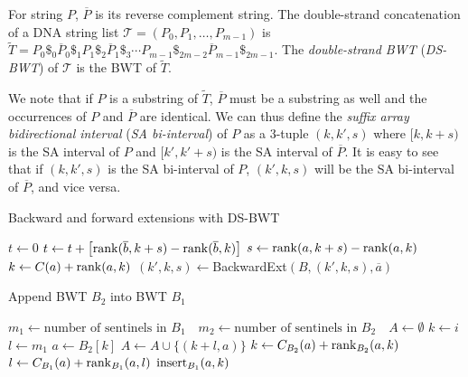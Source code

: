\documentclass[webpdf,contemporary,large,namedate]{oup-authoring-template}%
\begin{document}
For string $P$, $\overline{P}$ is its reverse complement string.
The double-strand concatenation of a DNA string list $\mathcal{T}=(P_0,P_1,\ldots,P_{m-1})$ is
$\tilde{T}=P_0\$_0\overline{P}_0\$_1P_1\$_2\overline{P}_1\$_3\cdots P_{m-1}\$_{2m-2}\overline{P}_{m-1}\$_{2m-1}$.
The \emph{double-strand BWT} (\emph{DS-BWT}) of $\mathcal{T}$ is the BWT of $\tilde{T}$.

We note that if $P$ is a substring of $\tilde{T}$,
$\overline{P}$ must be a substring as well and the occurrences of $P$ and $\overline{P}$ are identical.
We can thus define the \emph{suffix array bidirectional interval} (\emph{SA bi-interval}) of $P$
as a 3-tuple $(k,k',s)$ where $[k,k+s)$ is the SA interval of $P$ and $[k',k'+s)$ is the SA interval of $\overline{P}$.
It is easy to see that if $(k,k',s)$ is the SA bi-interval of $P$, $(k',k,s)$ will be the SA bi-interval of $\overline{P}$, and vice versa.

\begin{algorithm}[!htb]
	\caption{Backward and forward extensions with DS-BWT}
	\begin{algorithmic}[1]
			\State $t\gets 0$
				\State $t\gets t+\big[{\rm rank}(\overline{b},k+s)-{\rm rank}(\overline{b},k)\big]$
			\EndFor
			\State $s\gets {\rm rank}(a,k+s)-{\rm rank}(a,k)$
			\State $k\gets C(a)+{\rm rank}(a,k)$
			\State {}
		\EndProcedure
			\State $(k',k,s)\gets${\sc BackwardExt}$(B,(k',k,s),\overline{a})$
			\State {}
		\EndProcedure
	\end{algorithmic}
\end{algorithm}

\begin{algorithm}[!htb]
	\caption{Append BWT $B_2$ into BWT $B_1$}\label{algo:merge}
	\begin{algorithmic}[1]
			\State $m_1\gets\mbox{number of sentinels in $B_1$ }$
			\State $m_2\gets\mbox{number of sentinels in $B_2$ }$
			\State $A\gets \emptyset$
				\State $k\gets i$
				\State $l\gets m_1$
				\Repeat
					\State $a\gets B_2[k]$
					\State $A\gets A\cup \{(k+l,a)\}$
					\State $k\gets C_{B_2}(a)+{\rm rank}_{B_2}(a,k)$
					\State $l\gets C_{B_1}(a)+{\rm rank}_{B_1}(a,l)$
			\EndFor
				\State ${\rm insert}_{B_1}(a,k)$
			\EndFor
		\EndProcedure
	\end{algorithmic}
\end{algorithm}
\end{document}
